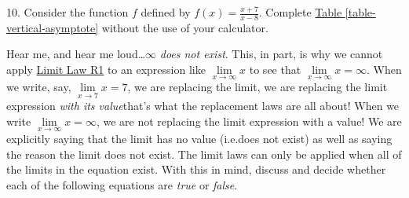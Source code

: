\documentclass[12pt,]{book}
\theoremstyle{plain}
\theoremstyle{definition}
\numberwithin{equation}{section}
\newcommand{\hrulemedium}{\noalign{\hrule height 0.07em}}
\newcommand{\hrulethick} {\noalign{\hrule height 0.11em}}
\newcounter{figstack}
\newcounter{figindex}
\newlength\fight
\newcommand\pushValignCaptionBottom[5][b]{%
\stepcounter{figstack}%
\expandafter\def\csname %
figalign\romannumeral\value{figstack}\endcsname{#1}%
\expandafter\def\csname %
figtype\romannumeral\value{figstack}\endcsname{#2}%
\expandafter\def\csname %
figwd\romannumeral\value{figstack}\endcsname{#3}%
\expandafter\def\csname %
figcontent\romannumeral\value{figstack}\endcsname{#4}%
\expandafter\def\csname %
figcap\romannumeral\value{figstack}\endcsname{#5}%
\setbox0=\hbox{%
\begin{#2}{#3}#4\end{#2}}%
\ifdim\dimexpr\ht0+\dp0\relax>\fight\global\setlength{\fight}{%
\dimexpr\ht0+\dp0\relax}\fi%
}
\newcommand\popValignCaptionBottom{%
\setcounter{figindex}{0}%
\hfill%
\whiledo{\value{figindex}<\value{figstack}}{%
\stepcounter{figindex}%
\def\tmp{\csname figwd\romannumeral\value{figindex}\endcsname}%
\begin{\csname figtype\romannumeral\value{figindex}\endcsname}[t]{\tmp}%
\centering%
\stackinset{c}{}%
{\csname figalign\romannumeral\value{figindex}\endcsname}{}%
{\csname figcontent\romannumeral\value{figindex}\endcsname}%
{\rule{0pt}{\fight}}\par%
\csname figcap\romannumeral\value{figindex}\endcsname%
\end{\csname figtype\romannumeral\value{figindex}\endcsname}%
\hfill%
}%
\setcounter{figstack}{0}%
\setlength{\fight}{0pt}%
\hfill%
}
\newcommand{\fe}[2]{#1\mathopen{}\left(#2\right)\mathclose{}}
\begin{document}
\begin{exerciselist}
\item[10.]\hypertarget{exercise-99}{\null}Consider the function \(f\) defined by \(\fe{f}{x}=\frac{x+7}{x-8}\). Complete \hyperref[table-vertical-asymptote]{Table \ref{table-vertical-asymptote}} without the use of your calculator.%
\par\smallskip
\hypertarget{exercisegroup-hear-me}{\null}Hear me, and hear me loud\dots{}\(\infty\) \emph{does not exist}. This, in part, is why we cannot apply \hyperref[llr1]{Limit Law R1} to an expression like \(\lim\limits_{x\to\infty}x\) to see that \(\lim\limits_{x\to\infty}x=\infty\). When we write, say, \(\lim\limits_{x\to7}x=7\), we are replacing the limit, we are replacing the limit expression \emph{with its value}\textemdash{}that's what the replacement laws are all about! When we write \(\lim\limits_{x\to\infty}x=\infty\), we are not replacing the limit expression with a value! We are explicitly saying that the limit has no value (i.e.\@ does not exist) as well as saying the reason the limit does not exist. The limit laws can only be applied when all of the limits in the equation exist. With this in mind, discuss and decide whether each of the following equations are \emph{true} or \emph{false}.%

\end{exerciselist}
\end{document}
